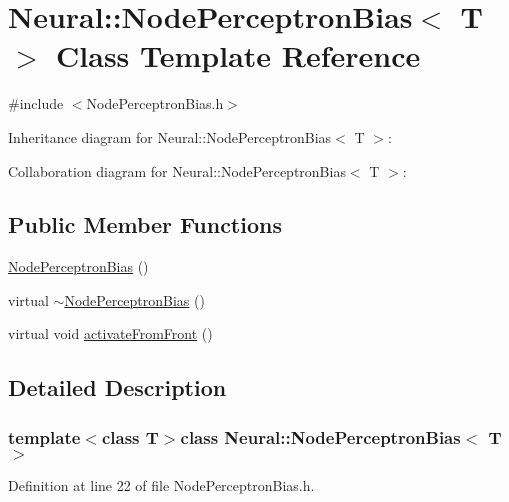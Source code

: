\hypertarget{class_neural_1_1_node_perceptron_bias}{
\section{Neural::NodePerceptronBias$<$ T $>$ Class Template Reference}
\label{class_neural_1_1_node_perceptron_bias}
}


{\ttfamily \#include $<$NodePerceptronBias.h$>$}



Inheritance diagram for Neural::NodePerceptronBias$<$ T $>$:


Collaboration diagram for Neural::NodePerceptronBias$<$ T $>$:
\subsection*{Public Member Functions}
\begin{DoxyCompactItemize}
\item 
\hyperlink{class_neural_1_1_node_perceptron_bias_aca6fcc5464f391c875dd8366a940296a}{NodePerceptronBias} ()
\item 
virtual \hyperlink{class_neural_1_1_node_perceptron_bias_a8a987709d61d48ad63bfa74e25607960}{$\sim$NodePerceptronBias} ()
\item 
virtual void \hyperlink{class_neural_1_1_node_perceptron_bias_abe8e6d1a10620e56bc41318581b50375}{activateFromFront} ()
\end{DoxyCompactItemize}


\subsection{Detailed Description}
\subsubsection*{template$<$class T$>$class Neural::NodePerceptronBias$<$ T $>$}



Definition at line 22 of file NodePerceptronBias.h.



